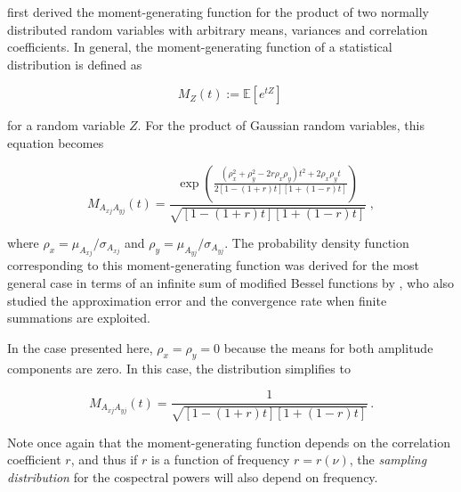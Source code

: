 \documentclass[fleqn,usenatbib]{mnras}
\begin{document}

\citet{craig1936} first derived the moment-generating function for the product of two normally distributed random variables with arbitrary means, variances and correlation coefficients. In general, the moment-generating function of a statistical distribution is defined as

\begin{equation}
M_Z(t) := \mathbb{E}[e^{tZ}] \, 
\end{equation}

\noindent for a random variable $Z$. For the product of Gaussian random variables, this equation becomes

\begin{equation}
M_{A_{xj}A_{yj}}(t) = \frac{\exp{\left( \frac{(\rho_x^2 + \rho_y^2 - 2r\rho_x \rho_y)t^2 + 2 \rho_x\rho_y t}{2[1 - (1 + r)t][1 + (1-r)t]}\right)}}{\sqrt{[1-(1+r)t][1+(1-r)t]}} \; ,
\end{equation}

\noindent where $\rho_x = \mu_{A_{xj}}/\sigma_{A_{xj}}$ and $\rho_y = \mu_{A_{yj}}/\sigma_{A_{yj}}$. The probability density function corresponding to this moment-generating function was derived for the most general case in terms of an infinite sum of modified Bessel functions by \citet{cui2016}, who also studied the approximation error and the convergence rate when finite summations are exploited. 

In the case presented here, $\rho_x = \rho_y = 0$ because the means for both amplitude components are zero. In this case, the distribution simplifies to 

\begin{equation}
M_{A_{xj}A_{yj}}(t) = \frac{1}{\sqrt{[1-(1+r)t][1+(1-r)t]}} \, .
\label{eqn:varmgf}
\end{equation}

\noindent Note once again that the moment-generating function depends on the correlation coefficient $r$, and thus if $r$ is a function of frequency $r = r(\nu)$, the \textit{sampling distribution} for the cospectral powers will also depend on frequency. 
\end{document}
